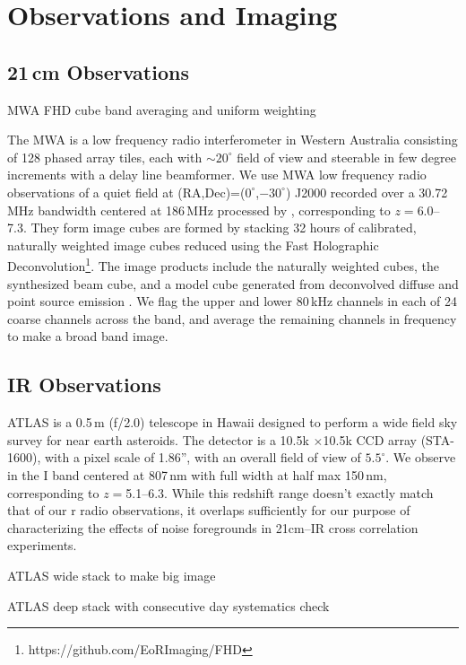 \documentclass{emulateapj}
\begin{document}
\section{Observations and Imaging}
\subsection{21\,cm Observations}

MWA FHD cube band averaging and uniform weighting

The MWA is a low frequency radio interferometer in Western Australia consisting of 128 phased array tiles, each with $\sim20^\circ$ field of view and steerable in few degree increments with a delay line beamformer. We use MWA low frequency radio observations of a quiet field at (RA,Dec)=($0^\circ$,$-30^\circ$) J2000 recorded over a 30.72\,MHz bandwidth centered at 186\,MHz processed by \citet{beardsley16}, corresponding to $z=$6.0--7.3. They form image cubes are formed by stacking 32 hours of calibrated, naturally weighted image cubes reduced using the Fast Holographic Deconvolution\footnote{https://github.com/EoRImaging/FHD}. The image products include the naturally weighted cubes, the synthesized beam cube, and a model cube generated from deconvolved diffuse and point source emission \citep{beardsley16,PattiCatalog1}. We flag the upper and lower 80\,kHz channels in each of 24 coarse channels across the band, and average the remaining channels in frequency to make a broad band image. 

\subsection{IR Observations}

ATLAS is a 0.5\,m (f/2.0) telescope \citep{tonry11} in Hawaii designed to perform a wide field sky survey for near earth asteroids. The detector is a 10.5k $\times$10.5k CCD array (STA-1600), with a pixel scale of 1.86'', with an overall field of view of $5.5^\circ$. We observe in the I band centered at 807\,nm with full width at half max 150\,nm, corresponding to $z=$5.1--6.3. While this redshift range doesn't exactly match that of our r radio observations, it overlaps sufficiently for our purpose of characterizing the effects of noise foregrounds in 21cm--IR cross correlation experiments.

ATLAS wide stack to make big image

ATLAS deep stack with consecutive day systematics check
\end{document}

